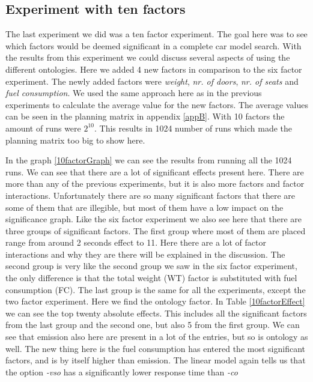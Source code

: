 \documentclass{llncs}
\begin{document}
\subsection{Experiment with ten factors}
The last experiment we did was a ten factor experiment. The goal here
was to see which factors would be deemed significant in a complete car
model search. With the results from this experiment we could discuss
several aspects of using the different ontologies.  Here we added 4
new factors in comparison to the six factor experiment. The newly
added factors were \textit{weight}, \textit{nr. of doors},
\textit{nr. of seats} and \textit{fuel consumption}. We used the same
approach here as in the previous experiments to calculate the average
value for the new factors. The average values can be seen in the
planning matrix in appendix \ref{appB}. With 10 factors the amount of
runs were $2^10$. This results in 1024 number of runs which made the
planning matrix too big to show here.

In the graph \vref{10factorGraph} we can see the results from running
all the 1024 runs.  We can see that there are a lot of significant
effects present here. There are more than any of the previous
experiments, but it is also more factors and factor interactions.
Unfortunately there are so many significant factors that there are
some of them that are illegible, but most of them have a low impact on
the significance graph. Like the six factor experiment we also see
here that there are three groups of significant factors. The first
group where most of them are placed range from around 2 seconds effect
to 11. Here there are a lot of factor interactions and why they are
there will be explained in the discussion.  The second group is very
like the second group we saw in the six factor experiment, the only
difference is that the total weight (WT) factor is substituted with
fuel consumption (FC). The last group is the same for all the
experiments, except the two factor experiment. Here we find the
ontology factor.  In Table \vref{10factorEffect} we can see the top
twenty absolute effects. This includes all the significant factors
from the last group and the second one, but also 5 from the first
group.  We can see that emission also here are present in a lot of the
entries, but so is ontology as well. The new thing here is the fuel
consumption has entered the most significant factors, and is by itself
higher than emission. The linear model again tells us that the option
\textit{-vso} has a significantly lower response time than
\textit{-co}
\end{document}

